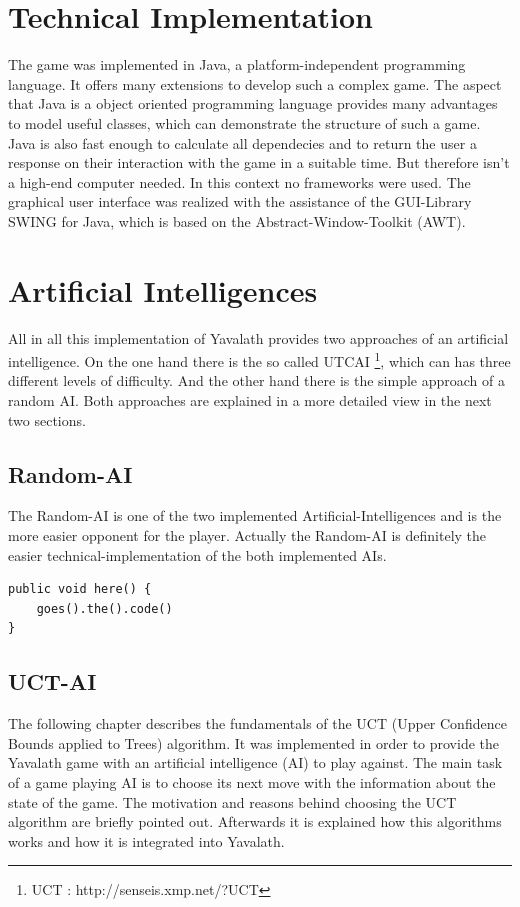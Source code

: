 \documentclass[german]{report}
\begin{document}
\chapter{Technical Implementation}
\label{sec:technImplementation}
The game was implemented in Java, a platform-independent programming language.
It offers many extensions to develop such a complex game. The aspect that Java
is a object oriented programming language provides many advantages to model
useful classes, which can demonstrate the structure of such a game. Java is also
fast enough to calculate all dependecies and to return the user a
response on their interaction with the game in a suitable time. But therefore
isn't a high-end computer needed. In this context no frameworks were used. The
graphical user interface was realized with the assistance of the GUI-Library
SWING for Java, which is based on the Abstract-Window-Toolkit (AWT).  




\chapter{Artificial Intelligences}
\label{sec:artificIntelligences}
All in all this implementation of Yavalath provides two approaches of an
artificial intelligence. On the one hand there is the so called UTCAI
\footnote{UCT : http://senseis.xmp.net/?UCT}, which can has three different
levels of difficulty. And the other hand there is the simple approach of a
random AI. Both approaches are explained in a more detailed view in the next two
sections. 


\section{Random-AI}
The Random-AI is one of the two implemented Artificial-Intelligences and is the
more easier opponent for the player. Actually the Random-AI is definitely the
easier technical-implementation of the both implemented AIs.

\begin{lstlisting}[label=some-code,caption=Some Code]
public void here() {
	goes().the().code()
}
\end{lstlisting}



\section{UCT-AI}
\label{sec:chapter4}
The following chapter describes the fundamentals of the UCT (Upper Confidence
Bounds applied to Trees) algorithm. It was implemented in order to provide the
Yavalath game with an artificial intelligence (AI) to play against. The main
task of a game playing AI is to choose its next move with the information about
the state of the game. The motivation and reasons behind choosing the UCT
algorithm are briefly pointed out. Afterwards it is explained how this
algorithms works and how it is integrated into Yavalath.
\end{document}
